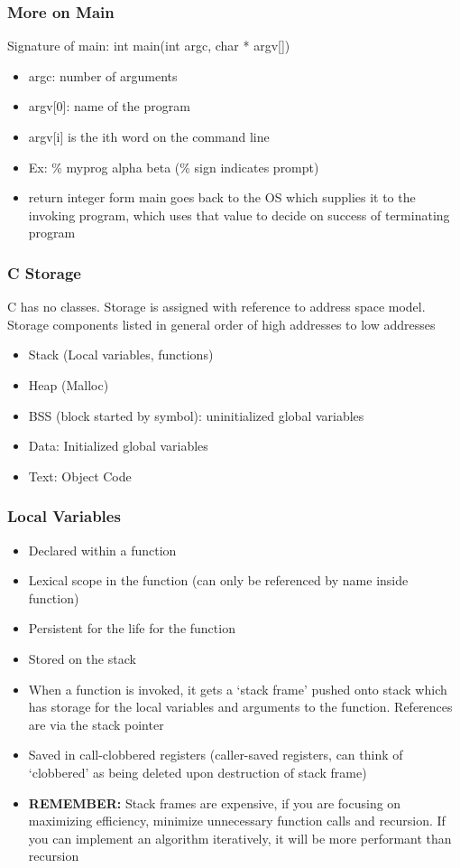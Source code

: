 \subsubsection{More on Main}
Signature of main: int main(int argc, char * argv[])
\begin{itemize} 
    \item argc: number of arguments
    \item argv[0]: name of the program
    \item argv[i] is the ith word on the command line
    \item Ex: \% myprog alpha beta (\% sign indicates prompt)
    \item return integer form main goes back to the OS which supplies it to the invoking program, which uses that value to decide on success of terminating program
\end{itemize}
\subsubsection{C Storage}
C has no classes. Storage is assigned with reference to address space model. Storage components listed in general order of high addresses to low addresses
\begin{itemize}
    \item Stack (Local variables, functions)
    \item Heap (Malloc)
    \item BSS (block started by symbol): uninitialized global variables
    \item Data: Initialized global variables
    \item Text: Object Code
\end{itemize}
\subsubsection{Local Variables}
\begin{itemize}
    \item Declared within a function
    \item Lexical scope in the function (can only be referenced by name inside function)
    \item Persistent for the life for the function
    \item Stored on the stack
    \item When a function is invoked, it gets a `stack frame' pushed onto stack which has storage for the local variables and arguments to the function. References are via the stack pointer
    \item Saved in call-clobbered registers (caller-saved registers, can think of `clobbered' as being deleted upon destruction of stack frame)
    \item \textbf{REMEMBER:} Stack frames are expensive, if you are focusing on maximizing efficiency, minimize unnecessary function calls and recursion. If you can implement an algorithm iteratively, it will be more performant than recursion
\end{itemize}
